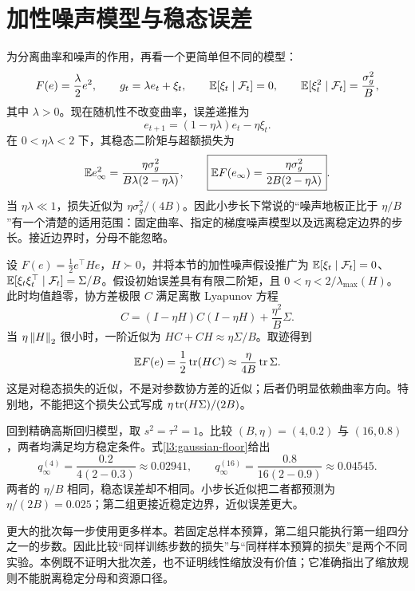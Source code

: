 \section{加性噪声模型与稳态误差}
\label{l3:additive-noise}

为分离曲率和噪声的作用，再看一个更简单但不同的模型：
\begin{equation}
 F(e)=\frac\lambda2e^2,
 \qquad g_t=\lambda e_t+\xi_t,
 \qquad \mathbb E[\xi_t\mid\mathcal F_t]=0,
 \qquad \mathbb E[\xi_t^2\mid\mathcal F_t]=\frac{\sigma_g^2}{B},
 \label{l3:additive-model}
\end{equation}
其中 $\lambda>0$。现在随机性不改变曲率，误差递推为
\[
 e_{t+1}=(1-\eta\lambda)e_t-\eta\xi_t.
\]
在 $0<\eta\lambda<2$ 下，其稳态二阶矩与超额损失为
\begin{equation}
 \mathbb E e_\infty^2=
 \frac{\eta\sigma_g^2}{B\lambda(2-\eta\lambda)},
 \qquad
 \boxed{\mathbb E F(e_\infty)=
 \frac{\eta\sigma_g^2}{2B(2-\eta\lambda)}}.
 \label{l3:additive-floor}
\end{equation}
当 $\eta\lambda\ll1$，损失近似为 $\eta\sigma_g^2/(4B)$。因此小步长下常说的“噪声地板正比于 $\eta/B$”有一个清楚的适用范围：固定曲率、指定的梯度噪声模型以及远离稳定边界的步长。接近边界时，分母不能忽略。

\begin{remark}[矩阵版本，选读]
设 $F(e)=\tfrac12e^\top He$，$H\succ0$，并将本节的加性噪声假设推广为 $\mathbb E[\xi_t\mid\mathcal F_t]=0$、$\mathbb E[\xi_t\xi_t^\top\mid\mathcal F_t]=\Sigma/B$。假设初始误差具有有限二阶矩，且 $0<\eta<2/\lambda_{\max}(H)$。此时均值趋零，协方差极限 $C$ 满足离散 Lyapunov 方程
\begin{equation}
 C=(I-\eta H)C(I-\eta H)+\frac{\eta^2}{B}\Sigma.
 \label{l3:lyapunov}
\end{equation}
当 $\eta\left\lVert H\right\rVert_2$ 很小时，一阶近似为
$HC+CH\approx\eta\Sigma/B$。取迹得到
\[
 \mathbb E F(e)=\frac12\operatorname{tr}(HC)\approx\frac{\eta}{4B}\operatorname{tr}\Sigma.
\]
这是对稳态损失的近似，不是对参数协方差的近似；后者仍明显依赖曲率方向。特别地，不能把这个损失公式写成 $\eta\operatorname{tr}(H\Sigma)/(2B)$。
\end{remark}

\begin{example}
回到精确高斯回归模型，取 $s^2=\tau^2=1$。比较 $(B,\eta)=(4,0.2)$ 与 $(16,0.8)$，两者均满足均方稳定条件。式\eqref{l3:gaussian-floor}给出
\[
 q_\infty^{(4)}=\frac{0.2}{4(2-0.3)}\approx0.02941,
 \qquad
 q_\infty^{(16)}=\frac{0.8}{16(2-0.9)}\approx0.04545.
\]
两者的 $\eta/B$ 相同，稳态误差却不相同。小步长近似把二者都预测为 $\eta/(2B)=0.025$；第二组更接近稳定边界，近似误差更大。

更大的批次每一步使用更多样本。若固定总样本预算，第二组只能执行第一组四分之一的步数。因此比较“同样训练步数的损失”与“同样样本预算的损失”是两个不同实验。本例既不证明大批次差，也不证明线性缩放没有价值；它准确指出了缩放规则不能脱离稳定分母和资源口径。
\end{example}

